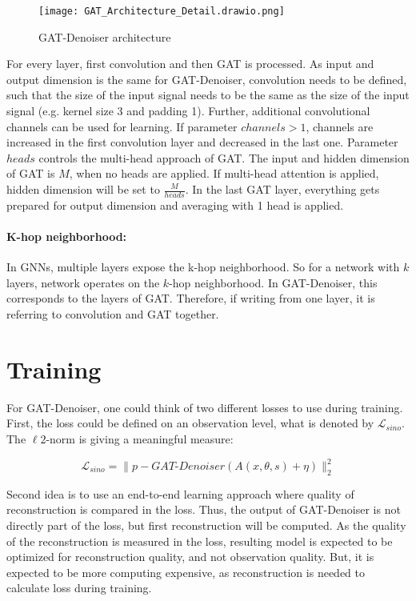 \begin{figure}[H]
  \centering
  \texttt{[image: GAT\_Architecture\_Detail.drawio.png]}
  \caption{GAT-Denoiser architecture}
  \label{fig:architecture-detailed}
\end{figure}


For every layer, first convolution and then GAT is processed. 
As input and output dimension is the same for GAT-Denoiser,
convolution needs to be defined, such that the size of the input signal needs to be the same as the size of the input signal
(e.g. kernel size 3 and padding 1).
Further, additional convolutional channels can be used for learning.
If parameter $channels > 1$, channels are increased in the first convolution layer 
and decreased in the last one.
Parameter $heads$ controls the multi-head approach of GAT. The input and hidden dimension
of GAT is $M$, when no heads are applied.
If multi-head attention is applied, hidden dimension will be set to $\frac{M}{heads}$.
In the last GAT layer, everything gets prepared for output dimension and 
averaging with 1 head is applied.

\paragraph{K-hop neighborhood:}
In GNNs, multiple layers expose the k-hop neighborhood. So for a network with $k$ layers,
network operates on the $k$-hop neighborhood. In GAT-Denoiser, this corresponds
to the layers of GAT. Therefore, if writing from one layer, it is referring to convolution and GAT together.

\section{Training}

For GAT-Denoiser, one could think of two different losses to use during training.
First, the loss could be defined on an observation level, what is denoted by $\mathcal{L}_{sino}$. 
The $\ell2$-norm is giving a meaningful measure:

\begin{equation}
  \label{eq:loss_sino}
  \mathcal{L}_{sino} = \parallel p - \textit{GAT-Denoiser}(A(x, \theta, s) + \eta) \parallel ^2_2
\end{equation}

Second idea is to use an end-to-end learning approach where quality of reconstruction is 
compared in the loss. Thus, the output of GAT-Denoiser is not directly part of the loss, but first reconstruction will be computed.
As the quality of the reconstruction is measured in the loss, resulting model is expected to be optimized
for reconstruction quality, and not observation quality. But, it is expected to be more computing expensive,
as reconstruction is needed to calculate loss during training.

